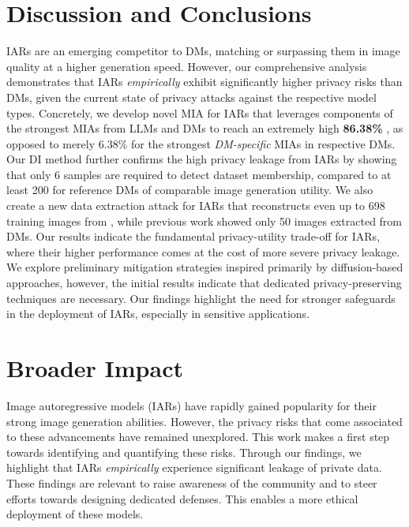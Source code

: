 \section{Discussion and Conclusions}
\label{sec:conclusions}

IARs are an emerging competitor to DMs, matching or surpassing them in image quality at a higher generation speed. However, our comprehensive analysis demonstrates that IARs \textit{empirically} exhibit significantly higher privacy risks than DMs, given the current state of privacy attacks against the respective model types. 
Concretely, we develop novel MIA for IARs that leverages components of the strongest MIAs from LLMs and DMs to reach an extremely high \textbf{86.38\%} \tprat, as opposed to merely 6.38\% for the strongest \textit{DM-specific} MIAs in respective DMs. 
Our DI method further confirms the high privacy leakage from IARs by showing that only 6 samples are required to detect dataset membership, compared to at least 200 for reference DMs of comparable image generation utility. We also create a new data extraction attack for IARs that reconstructs even up to 698 training images from \varlarge, while previous work showed only 50 images extracted from DMs. Our results indicate the fundamental privacy-utility trade-off for IARs, where their higher performance comes at the cost of more severe privacy leakage. 
We explore preliminary mitigation strategies inspired primarily by diffusion-based approaches, however, the initial results indicate that dedicated privacy-preserving techniques are necessary. Our findings highlight the need for stronger safeguards in the deployment of IARs, especially in sensitive applications.



\section*{Broader Impact}
Image autoregressive models (IARs) have rapidly gained popularity for their strong image generation abilities. 
However, the privacy risks that come associated to these advancements have remained unexplored.
This work makes a first step towards identifying and quantifying these risks. Through our findings, we highlight that IARs 
 \textit{empirically} experience significant leakage of private data.
These findings are relevant to raise awareness of the community and to steer efforts towards designing dedicated defenses.
This enables a more ethical deployment of these models.


